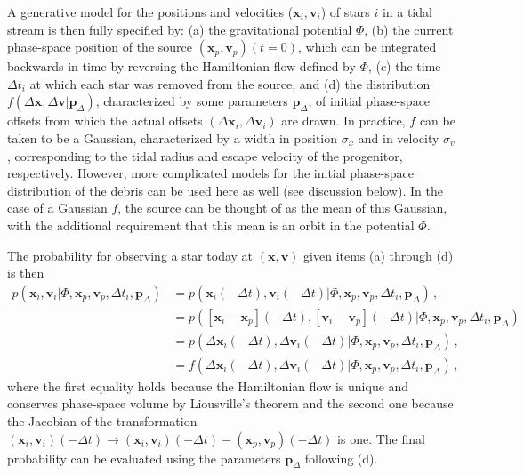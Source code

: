 \documentclass[12pt,preprint]{aastex}
\renewcommand{\vec}[1]{\ensuremath{\mathbf{#1}}}
\newcommand{\vecx}{\ensuremath{\vec{x}}}
\newcommand{\vecv}{\ensuremath{\vec{v}}}
\newcommand{\paramsdiff}{\ensuremath{\vec{p}_\Delta}}
\begin{document}
A generative model for the positions and velocities
($\vecx_i,\vecv_i$) of stars $i$ in a tidal stream is then fully
specified by: (a) the gravitational potential $\Phi$, (b) the current
phase-space position of the source $(\vecx_p,\vecv_p)(t=0)$, which can
be integrated backwards in time by reversing the Hamiltonian flow
defined by $\Phi$, (c) the time $\Delta t_i$ at which each star was
removed from the source, and (d) the distribution $f(\Delta
\vecx,\Delta \vecv|\paramsdiff)$, characterized by some parameters
$\paramsdiff$, of initial phase-space offsets from which the actual
offsets $(\Delta \vecx_i,\Delta \vecv_i)$ are drawn. In practice, $f$
can be taken to be a Gaussian, characterized by a width in position
$\sigma_x$ and in velocity $\sigma_v$, corresponding to the tidal
radius and escape velocity of the progenitor, respectively. However,
more complicated models for the initial phase-space distribution of
the debris can be used here as well (see discussion below). In the
case of a Gaussian $f$, the source can be thought of as the mean of
this Gaussian, with the additional requirement that this mean is an
orbit in the potential $\Phi$.

The probability for observing a star today at $(\vecx,\vecv)$ given
items (a) through (d) is then
\begin{align}\label{eq:realdft}
  p(\vecx_i,\vecv_i | \Phi,\vecx_p,\vecv_p,\Delta t_i,\paramsdiff) 
  & = p(\vecx_i(-\Delta t),\vecv_i(-\Delta t) | \Phi,\vecx_p,\vecv_p,\Delta t_i,\paramsdiff) \,,\nonumber\\
  & = p([\vecx_i-\vecx_p](-\Delta t),[\vecv_i-\vecv_p](-\Delta t) | \Phi,\vecx_p,\vecv_p,\Delta t_i,\paramsdiff) \,\nonumber\\
  & = p(\Delta\vecx_i(-\Delta t),\Delta\vecv_i(-\Delta t) | \Phi,\vecx_p,\vecv_p,\Delta t_i,\paramsdiff)\,,\\
  & = f(\Delta\vecx_i(-\Delta t),\Delta\vecv_i(-\Delta t) | \Phi,\vecx_p,\vecv_p,\Delta t_i,\paramsdiff)\, ,\nonumber
\end{align}
where the first equality holds because the Hamiltonian flow is unique
and conserves phase-space volume by Liousville's theorem and the
second one because the Jacobian of the transformation
$(\vecx_i,\vecv_i)(-\Delta t) \rightarrow (\vecx_i,\vecv_i)(-\Delta t)
- (\vecx_p,\vecv_p)(-\Delta t)$ is one. The final probability can be
evaluated using the parameters $\paramsdiff$ following (d).
\end{document}
